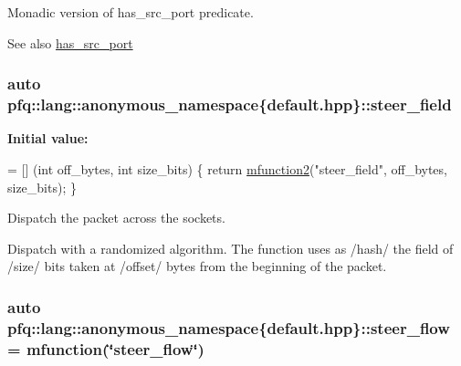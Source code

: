 Monadic version of {\ttfamily has\+\_\+src\+\_\+port} predicate. 

\begin{DoxySeeAlso}{See also}
\hyperlink{namespacepfq_1_1lang_1_1anonymous__namespace_02default_8hpp_03_a964d5ed41f50a1f3a04176f8e54d7a5a}{has\+\_\+src\+\_\+port} 
\end{DoxySeeAlso}
\hypertarget{namespacepfq_1_1lang_1_1anonymous__namespace_02default_8hpp_03_ad861e297a10876e534c5c9053ec23999}{
\subsubsection[{steer\+\_\+field}]{\setlength{\rightskip}{0pt plus 5cm}auto pfq\+::lang\+::anonymous\+\_\+namespace\{default.\+hpp\}\+::steer\+\_\+field}}\label{namespacepfq_1_1lang_1_1anonymous__namespace_02default_8hpp_03_ad861e297a10876e534c5c9053ec23999}
{\bfseries Initial value\+:}
\begin{DoxyCode}
= [] (\textcolor{keywordtype}{int} off\_bytes, \textcolor{keywordtype}{int} size\_bits) \{
                                \textcolor{keywordflow}{return} \hyperlink{namespacepfq_1_1lang_aab1a000712bb2711044255ca1626cc84}{mfunction2}(\textcolor{stringliteral}{"steer\_field"}, off\_bytes, size\_bits);
                           \}
\end{DoxyCode}


Dispatch the packet across the sockets. 

Dispatch with a randomized algorithm. The function uses as /hash/ the field of /size/ bits taken at /offset/ bytes from the beginning of the packet. \hypertarget{namespacepfq_1_1lang_1_1anonymous__namespace_02default_8hpp_03_adeb44c976ac903e7b13addb65ac41f9f}{
\subsubsection[{steer\+\_\+flow}]{\setlength{\rightskip}{0pt plus 5cm}auto pfq\+::lang\+::anonymous\+\_\+namespace\{default.\+hpp\}\+::steer\+\_\+flow = {\bf mfunction}(\char`\"{}steer\+\_\+flow\char`\"{})}}\label{namespacepfq_1_1lang_1_1anonymous__namespace_02default_8hpp_03_adeb44c976ac903e7b13addb65ac41f9f}


